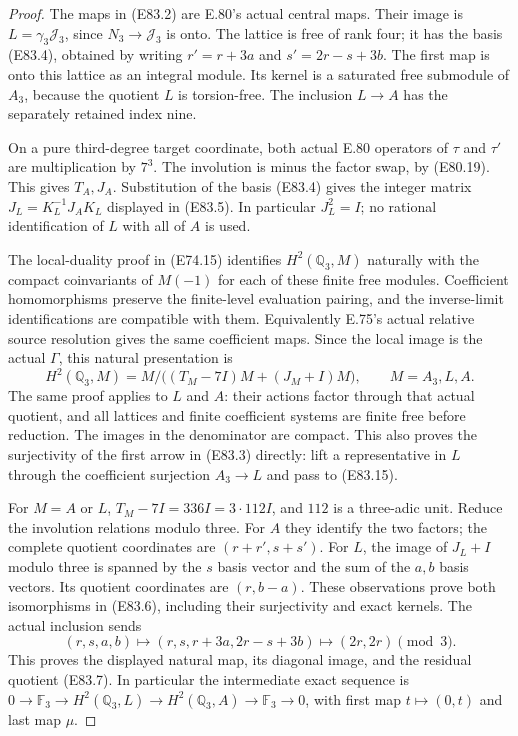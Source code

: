 \begin{proof}
The maps in (E83.2) are E.80's actual central maps.
Their image is $L=\gamma_3\mathcal J_3$, since
$N_3\to\mathcal J_3$ is onto. The lattice is
free of rank four; it has the basis (E83.4),
obtained by writing $r'=r+3a$ and
$s'=2r-s+3b$. The first map is onto this lattice
as an integral module. Its kernel is a saturated
free submodule of $A_3$, because the quotient
$L$ is torsion-free. The inclusion $L\to A$
has the separately retained index nine.

On a pure third-degree target coordinate, both
actual E.80 operators of $\tau$ and $\tau'$ are
multiplication by $7^3$. The involution is minus
the factor swap, by (E80.19). This gives $T_A,J_A$.
Substitution of the basis (E83.4) gives the integer
matrix $J_L=K_L^{-1}J_AK_L$ displayed in (E83.5).
In particular $J_L^2=I$; no rational identification
of $L$ with all of $A$ is used.

The local-duality proof in (E74.15) identifies
$H^2(\mathbb Q_3,M)$ naturally with the compact
coinvariants of $M(-1)$ for each of these finite
free modules. Coefficient homomorphisms preserve
the finite-level evaluation pairing, and the
inverse-limit identifications are compatible with
them. Equivalently E.75's actual relative source
resolution gives the same coefficient maps. Since
the local image is the actual $\Gamma$, this
natural presentation is
\[
 H^2(\mathbb Q_3,M)
     =M/\bigl((T_M-7I)M+(J_M+I)M\bigr),
             \qquad M=A_3,L,A.
 \tag{E83.15}
\]
The same proof applies to $L$ and $A$: their
actions factor through that actual quotient, and
all lattices and finite coefficient systems are
finite free before reduction. The images in the
denominator are compact. This also proves the
surjectivity of the first arrow in
(E83.3) directly: lift a representative in $L$
through the coefficient surjection $A_3\to L$
and pass to (E83.15).

For $M=A$ or $L$, $T_M-7I=336I=3\cdot112I$,
and $112$ is a three-adic unit. Reduce the
involution relations modulo three. For $A$ they
identify the two factors; the complete quotient
coordinates are $(r+r',s+s')$. For $L$, the
image of $J_L+I$ modulo three is spanned by
the $s$ basis vector and the sum of the $a,b$
basis vectors. Its quotient coordinates are
$(r,b-a)$. These observations prove both
isomorphisms in (E83.6), including their
surjectivity and exact kernels. The actual
inclusion sends
\[
  (r,s,a,b)\longmapsto(r,s,r+3a,2r-s+3b)
   \longmapsto(2r,2r)\pmod3.
 \tag{E83.16}
\]
This proves the displayed natural map, its
diagonal image, and the residual quotient (E83.7).
In particular the intermediate exact sequence is
$0\to\mathbb F_3\to H^2(\mathbb Q_3,L)
  \to H^2(\mathbb Q_3,A)\to\mathbb F_3\to0$,
with first map $t\mapsto(0,t)$ and last map $\mu$.


\end{proof}
